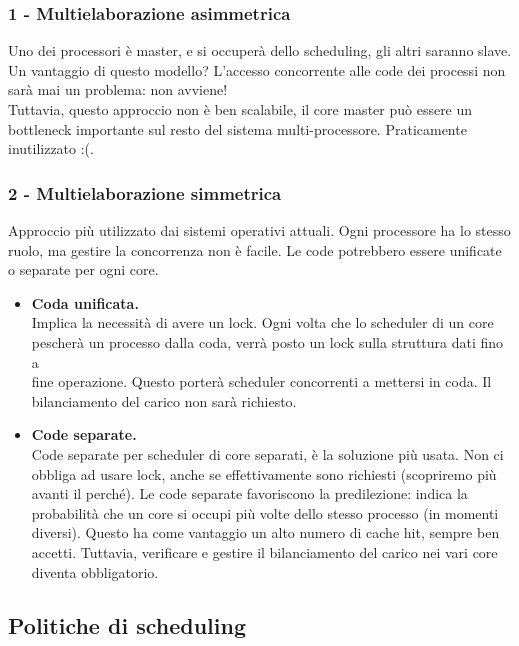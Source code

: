 \documentclass{report}
\begin{document}
\subsubsection{1 - Multielaborazione asimmetrica}
Uno dei processori è master, e si occuperà dello scheduling, gli altri saranno slave. 
Un vantaggio di questo modello? L'accesso concorrente alle code dei processi non sarà mai un problema: non avviene!\\
Tuttavia, questo approccio non è ben scalabile, il core master può essere un bottleneck importante sul resto del sistema multi-processore. Praticamente inutilizzato :(.

\subsubsection{2 - Multielaborazione simmetrica}
Approccio più utilizzato dai sistemi operativi attuali. Ogni processore ha lo stesso ruolo, ma gestire la concorrenza non è facile. Le code potrebbero essere unificate o separate per ogni core. 

\begin{itemize}
    \item \textbf{Coda unificata.}\\
    Implica la necessità di avere un lock. Ogni volta che lo scheduler di un core pescherà un processo dalla coda, verrà posto un lock sulla struttura dati fino a \\fine operazione. Questo porterà scheduler concorrenti a mettersi in coda. Il bilanciamento del carico non sarà richiesto.
    \item \textbf{Code separate.}\\
    Code separate per scheduler di core separati, è la soluzione più usata. Non ci obbliga ad usare lock, anche se effettivamente sono richiesti (scopriremo più avanti il perché). Le code separate favoriscono la predilezione: indica la probabilità che un core si occupi più volte dello stesso processo (in momenti diversi). Questo ha come vantaggio un alto numero di cache hit, sempre ben accetti. Tuttavia, verificare e gestire il bilanciamento del carico nei vari core diventa obbligatorio. 
\end{itemize}

\subsection{Politiche di scheduling}
\end{document}
